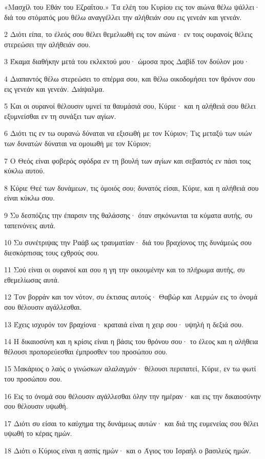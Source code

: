 \par «Μασχίλ του Εθάν του Εζραΐτου.» Τα ελέη του Κυρίου εις τον αιώνα θέλω ψάλλει· διά του στόματός μου θέλω αναγγέλλει την αλήθειάν σου εις γενεάν και γενεάν.
\par 2 Διότι είπα, το έλεός σου θέλει θεμελιωθή εις τον αιώνα· εν τοις ουρανοίς θέλεις στερεώσει την αλήθειάν σου.
\par 3 Έκαμα διαθήκην μετά του εκλεκτού μου· ώμοσα προς Δαβίδ τον δούλον μου·
\par 4 Διαπαντός θέλω στερεώσει το σπέρμα σου, και θέλω οικοδομήσει τον θρόνον σου εις γενεάν και γενεάν. Διάψαλμα.
\par 5 Και οι ουρανοί θέλουσιν υμνεί τα θαυμάσιά σου, Κύριε· και η αλήθειά σου θέλει εξυμνείσθαι εν τη συνάξει των αγίων.
\par 6 Διότι τις εν τω ουρανώ δύναται να εξισωθή με τον Κύριον; Τις μεταξύ των υιών των δυνατών δύναται να ομοιωθή με τον Κύριον;
\par 7 Ο Θεός είναι φοβερός σφόδρα εν τη βουλή των αγίων και σεβαστός εν πάσι τοις κύκλω αυτού.
\par 8 Κύριε Θεέ των δυνάμεων, τις όμοιός σου; δυνατός είσαι, Κύριε, και η αλήθειά σου είναι κύκλω σου.
\par 9 Συ δεσπόζεις την έπαρσιν της θαλάσσης· όταν σηκόνωνται τα κύματα αυτής, συ ταπεινόνεις αυτά.
\par 10 Συ συνέτριψας την Ραάβ ως τραυματίαν· διά του βραχίονος της δυνάμεώς σου διεσκόρπισας τους εχθρούς σου.
\par 11 Σού είναι οι ουρανοί και σου η γη την οικουμένην και το πλήρωμα αυτής, συ εθεμελίωσας αυτά.
\par 12 Τον βορράν και τον νότον, συ έκτισας αυτούς· Θαβώρ και Αερμών εις το όνομά σου θέλουσιν αγάλλεσθαι.
\par 13 Έχεις ισχυρόν τον βραχίονα· κραταιά είναι η χειρ σου· υψηλή η δεξιά σου.
\par 14 Η δικαιοσύνη και η κρίσις είναι η βάσις του θρόνου σου· το έλεος και η αλήθεια θέλουσι προπορεύεσθαι έμπροσθεν του προσώπου σου.
\par 15 Μακάριος ο λαός ο γινώσκων αλαλαγμόν· θέλουσι περιπατεί, Κύριε, εν τω φωτί του προσώπου σου.
\par 16 Εις το όνομά σου θέλουσιν αγάλλεσθαι όλην την ημέραν· και εις την δικαιοσύνην σου θέλουσιν υψωθή.
\par 17 Διότι συ είσαι το καύχημα της δυνάμεως αυτών· και διά της ευμενείας σου θέλει υψωθή το κέρας ημών.
\par 18 Διότι ο Κύριος είναι η ασπίς ημών· και ο Άγιος του Ισραήλ ο βασιλεύς ημών.
